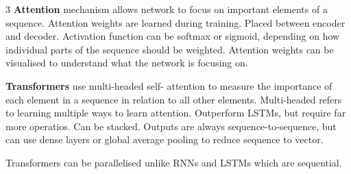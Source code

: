 \documentclass{article}
\begin{document}
\begin{multicols}{3}
    \textbf{Attention} mechanism allows network to focus on important
    elements of a sequence. Attention weights are learned during training.
    Placed between encoder and decoder. Activation function can be
    softmax or sigmoid, depending on how individual parts of the
    sequence should be weighted. Attention weights can be visualised to
    understand what the network is focusing on.

    \textbf{Transformers} use multi-headed self- attention to measure the
    importance of each element in a sequence in relation to all other
    elements. Multi-headed refers to learning multiple ways to learn
    attention. Outperform LSTMs, but require far more operatios. Can be
    stacked. Outputs are always sequence-to-sequence, but can use dense
    layers or global average pooling to reduce sequence to vector.

    Transformers can be parallelised unlike RNNs and LSTMs which are sequential.
\end{multicols}
\end{document}
